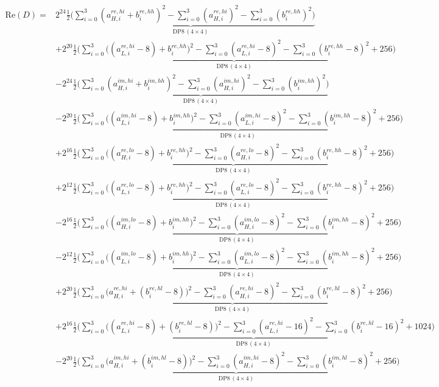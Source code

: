 \documentclass[fleqn]{article}
\newcommand{\DPop}[3]{\mathrm{DP#1}\,(#2\!\times\!#3)}
\begin{document}
\begin{align*}
\mathrm{Re}(D) = {}
  & 2^{24}\underbrace{\tfrac12\Big(\sum_{i=0}^{3}(a_{H,i}^{re,hi}{+}b_i^{re,hh})^2 - \sum_{i=0}^{3}(a_{H,i}^{re,hi})^2 - \sum_{i=0}^{3}(b_i^{re,hh})^2\Big)}_{\DPop{8}{4}{4}} \\[0.35em]
  & + 2^{20}\underbrace{\tfrac12\Big(\sum_{i=0}^{3}\big((a_{L,i}^{re,hi}{-}8){+}b_i^{re,hh}\big)^2 - \sum_{i=0}^{3}(a_{L,i}^{re,hi}{-}8)^2 - \sum_{i=0}^{3}(b_i^{re,hh}{-}8)^2 + 256\Big)}_{\DPop{8}{4}{4}} \\[0.35em]
  & - 2^{24}\underbrace{\tfrac12\Big(\sum_{i=0}^{3}(a_{H,i}^{im,hi}{+}b_i^{im,hh})^2 - \sum_{i=0}^{3}(a_{H,i}^{im,hi})^2 - \sum_{i=0}^{3}(b_i^{im,hh})^2\Big)}_{\DPop{8}{4}{4}} \\[0.35em]
  & - 2^{20}\underbrace{\tfrac12\Big(\sum_{i=0}^{3}\big((a_{L,i}^{im,hi}{-}8){+}b_i^{im,hh}\big)^2 - \sum_{i=0}^{3}(a_{L,i}^{im,hi}{-}8)^2 - \sum_{i=0}^{3}(b_i^{im,hh}{-}8)^2 + 256\Big)}_{\DPop{8}{4}{4}} \\[0.35em]
  & + 2^{16}\underbrace{\tfrac12\Big(\sum_{i=0}^{3}\big((a_{H,i}^{re,lo}{-}8){+}b_i^{re,hh}\big)^2 - \sum_{i=0}^{3}(a_{H,i}^{re,lo}{-}8)^2 - \sum_{i=0}^{3}(b_i^{re,hh}{-}8)^2 + 256\Big)}_{\DPop{8}{4}{4}} \\[0.35em]
  & + 2^{12}\underbrace{\tfrac12\Big(\sum_{i=0}^{3}\big((a_{L,i}^{re,lo}{-}8){+}b_i^{re,hh}\big)^2 - \sum_{i=0}^{3}(a_{L,i}^{re,lo}{-}8)^2 - \sum_{i=0}^{3}(b_i^{re,hh}{-}8)^2 + 256\Big)}_{\DPop{8}{4}{4}} \\[0.35em]
  & - 2^{16}\underbrace{\tfrac12\Big(\sum_{i=0}^{3}\big((a_{H,i}^{im,lo}{-}8){+}b_i^{im,hh}\big)^2 - \sum_{i=0}^{3}(a_{H,i}^{im,lo}{-}8)^2 - \sum_{i=0}^{3}(b_i^{im,hh}{-}8)^2 + 256\Big)}_{\DPop{8}{4}{4}} \\[0.35em]
  & - 2^{12}\underbrace{\tfrac12\Big(\sum_{i=0}^{3}\big((a_{L,i}^{im,lo}{-}8){+}b_i^{im,hh}\big)^2 - \sum_{i=0}^{3}(a_{L,i}^{im,lo}{-}8)^2 - \sum_{i=0}^{3}(b_i^{im,hh}{-}8)^2 + 256\Big)}_{\DPop{8}{4}{4}} \\[0.35em]
  & + 2^{20}\underbrace{\tfrac12\Big(\sum_{i=0}^{3}\big(a_{H,i}^{re,hi}{+}(b_i^{re,hl}{-}8)\big)^2 - \sum_{i=0}^{3}(a_{H,i}^{re,hi}{-}8)^2 - \sum_{i=0}^{3}(b_i^{re,hl}{-}8)^2 + 256\Big)}_{\DPop{8}{4}{4}} \\[0.35em]
  & + 2^{16}\underbrace{\tfrac12\Big(\sum_{i=0}^{3}\big((a_{L,i}^{re,hi}{-}8){+}(b_i^{re,hl}{-}8)\big)^2 - \sum_{i=0}^{3}(a_{L,i}^{re,hi}{-}16)^2 - \sum_{i=0}^{3}(b_i^{re,hl}{-}16)^2 + 1024\Big)}_{\DPop{8}{4}{4}} \\[0.35em]
  & - 2^{20}\underbrace{\tfrac12\Big(\sum_{i=0}^{3}\big(a_{H,i}^{im,hi}{+}(b_i^{im,hl}{-}8)\big)^2 - \sum_{i=0}^{3}(a_{H,i}^{im,hi}{-}8)^2 - \sum_{i=0}^{3}(b_i^{im,hl}{-}8)^2 + 256\Big)}_{\DPop{8}{4}{4}} \\[0.35em]

\end{align*}
\end{document}
